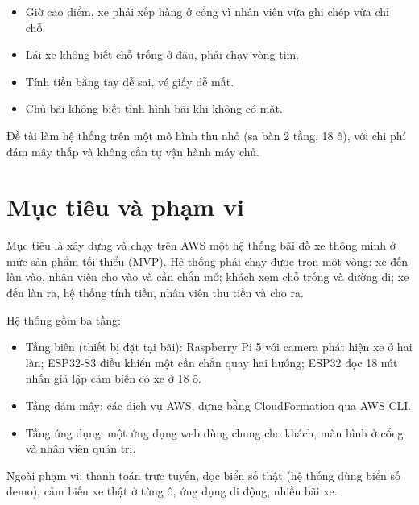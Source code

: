 \begin{itemize}
  \item Giờ cao điểm, xe phải xếp hàng ở cổng vì nhân viên vừa ghi chép vừa chỉ chỗ.
  \item Lái xe không biết chỗ trống ở đâu, phải chạy vòng tìm.
  \item Tính tiền bằng tay dễ sai, vé giấy dễ mất.
  \item Chủ bãi không biết tình hình bãi khi không có mặt.
\end{itemize}

Đề tài làm hệ thống trên một mô hình thu nhỏ (sa bàn 2 tầng, 18 ô), với chi phí đám mây thấp và không cần tự vận hành máy chủ.

\section{Mục tiêu và phạm vi}

Mục tiêu là xây dựng và chạy trên AWS một hệ thống bãi đỗ xe thông minh ở mức sản phẩm tối thiểu (MVP). Hệ thống phải chạy được trọn một vòng: xe đến làn vào, nhân viên cho vào và cần chắn mở; khách xem chỗ trống và đường đi; xe đến làn ra, hệ thống tính tiền, nhân viên thu tiền và cho ra.

Hệ thống gồm ba tầng:
\begin{itemize}
  \item Tầng biên (thiết bị đặt tại bãi): Raspberry Pi 5 với camera phát hiện xe ở hai làn; ESP32-S3 điều khiển một cần chắn quay hai hướng; ESP32 đọc 18 nút nhấn giả lập cảm biến có xe ở 18 ô.
  \item Tầng đám mây: các dịch vụ AWS, dựng bằng CloudFormation qua AWS CLI.
  \item Tầng ứng dụng: một ứng dụng web dùng chung cho khách, màn hình ở cổng và nhân viên quản trị.
\end{itemize}

Ngoài phạm vi: thanh toán trực tuyến, đọc biển số thật (hệ thống dùng biển số demo), cảm biến xe thật ở từng ô, ứng dụng di động, nhiều bãi xe.
